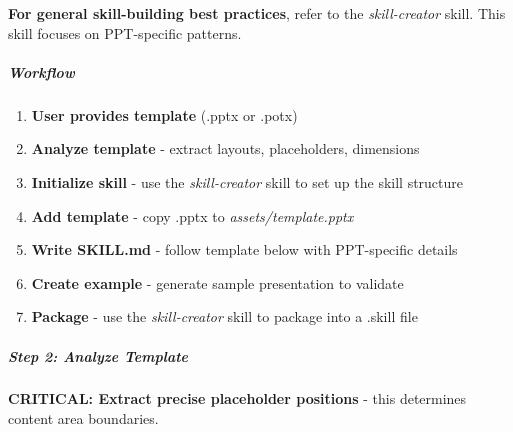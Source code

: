 \documentclass[11pt]{article}
\begin{document}
\textbf{For general skill-building best practices}, refer to the \emph{skill-creator} skill. This skill focuses on PPT-specific patterns.


\subparagraph{Workflow}\mbox{}\par

\begin{enumerate}[leftmargin=*,itemsep=2pt,topsep=2pt]
\item {} \textbf{User provides template} (.pptx or .potx)
\item {} \textbf{Analyze template} - extract layouts, placeholders, dimensions
\item {} \textbf{Initialize skill} - use the \emph{skill-creator} skill to set up the skill structure
\item {} \textbf{Add template} - copy .pptx to \emph{assets/template.pptx}
\item {} \textbf{Write SKILL.md} - follow template below with PPT-specific details
\item {} \textbf{Create example} - generate sample presentation to validate
\item {} \textbf{Package} - use the \emph{skill-creator} skill to package into a .skill file
\end{enumerate}

\subparagraph{Step 2: Analyze Template}\mbox{}\par

\textbf{CRITICAL: Extract precise placeholder positions} - this determines content area boundaries.
\end{document}
